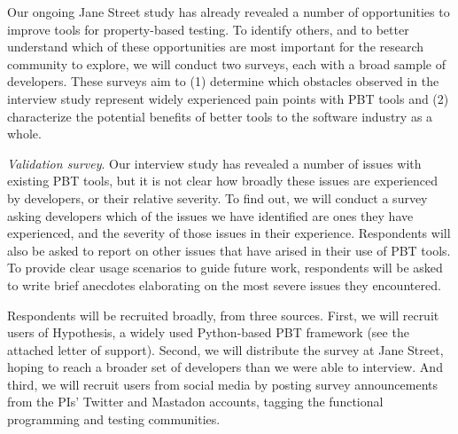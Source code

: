 \iflater{}\fi


Our ongoing Jane Street study has already revealed a number of
opportunities to improve tools for property-based testing. To identify
others, and to better understand which of these opportunities are most
important for the research community to explore, we will conduct two
surveys, each with a broad sample of developers. These surveys aim to
(1) determine which obstacles observed in the interview study
represent widely experienced pain points with PBT tools and
(2) characterize the potential benefits of better tools to the
software industry as a whole.

\emph{Validation survey}. Our interview study has revealed
a number of issues with existing PBT tools, but it is not clear
how broadly these issues are experienced by developers, or
their relative severity. To find out, we will conduct a survey
asking developers which of the issues we have identified are
ones they have experienced, and the severity of those issues
in their experience. Respondents will also be asked to report on
other issues that have arised in their use of PBT tools.
To provide
clear usage scenarios to guide future work, respondents will
be asked to write brief anecdotes elaborating on the
most severe issues they encountered.

Respondents will
be recruited broadly, from three sources. First, we will recruit
users of Hypothesis, a widely used Python-based PBT
framework
(see the attached letter of support).
Second, we will distribute the survey at Jane Street, hoping to reach
a broader set of developers than we were able to interview.
And third, we will recruit users from social media by posting
survey announcements from the PIs' Twitter and Mastadon
accounts, tagging the functional programming and testing
communities. 

